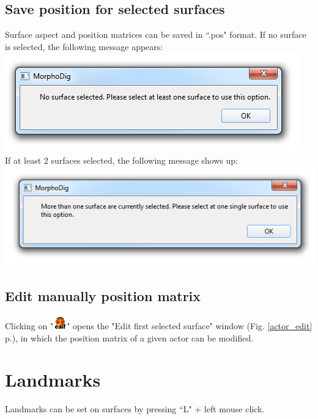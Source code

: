 \subsection{Save position for selected surfaces}
Surface aspect and position matrices can be saved in ``.pos" format. If no surface is selected, the
following message appears:\\
\includegraphics[scale=0.5]{images/07/position/no_surface_selected.png}
\\
If at least 2 surfaces selected, the following message shows up:\\
\includegraphics[scale=0.5]{images/07/position/at_least_2_surfaces_selected.png}

\subsection{Edit manually position matrix}
Clicking on "\includegraphics[scale=0.7]{images/06/objects/actor_edit.png}" opens the "Edit first selected surface" window (Fig. \ref{actor_edit} p.\pageref{actor_edit}), in which the position matrix of a given actor can be modified.



\section{Landmarks}
Landmarks can be set on surfaces by pressing ``L" + left mouse click.\\

